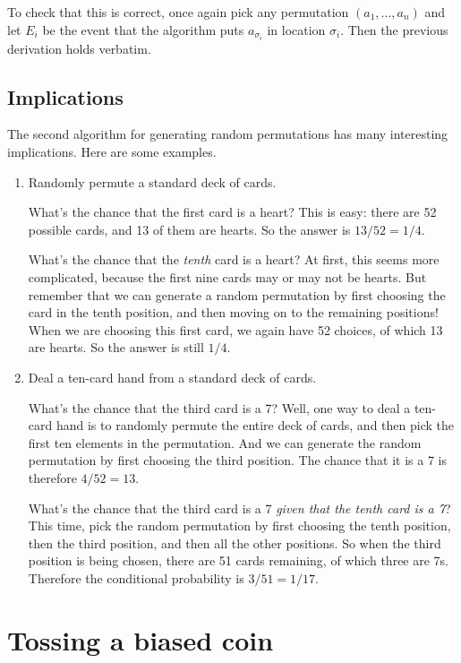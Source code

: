 \noindent
To check that this is correct, once again pick any permutation $(a_1, \ldots, a_n)$
and let $E_i$ be the event that the algorithm puts $a_{\sigma_i}$ in location $\sigma_i$.
Then the previous derivation holds verbatim.

\subsection{Implications}

The second algorithm for generating random permutations has many interesting implications.
Here are some examples.

\begin{enumerate}
\item Randomly permute a standard deck of cards.

What's the chance that the first card is a heart? This is easy: there are 52 possible cards, and 13 of them are hearts. So the answer is $13/52 = 1/4$.

What's the chance that the {\it tenth} card is a heart? At first, this seems more complicated, because the first nine cards may or may not be hearts. But remember that we can generate a random permutation by first choosing the card in the tenth position, and then moving on to the remaining positions! When we are choosing this first card, we again have 52 choices, of which 13 are hearts. So the answer is still $1/4$.

\item Deal a ten-card hand from a standard deck of cards.

What's the chance that the third card is a 7? Well, one way to deal a ten-card hand is to randomly permute the entire deck of cards, and then pick the first ten elements in the permutation. And we can generate the random permutation by first choosing the third position. The chance that it is a 7 is therefore $4/52 = 13$.

What's the chance that the third card is a 7 {\it given that the tenth card is a 7}? This time, pick the random permutation by first choosing the tenth position, then the third position, and then all the other positions. So when the third position is being chosen, there are 51 cards remaining, of which three are 7s. Therefore the conditional probability is $3/51 = 1/17$.

\end{enumerate}

\section{Tossing a biased coin}

